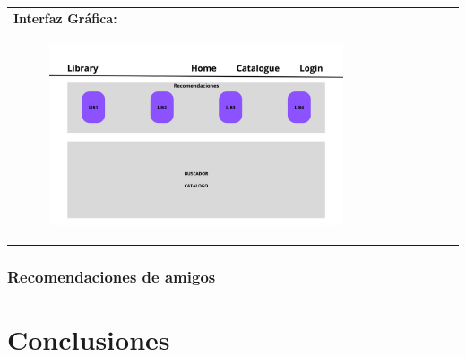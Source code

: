 \documentclass{report}
\begin{document}
\begin{center}
\begin{longtable}{|p{\linewidth}|}
                    \textbf{Interfaz Gráfica:}\\
                    \begin{figure}[H]
                        \centering
                        \includegraphics[width=0.8\textwidth]{./img/grafico/recom_lib.png}
                    \end{figure}\\
                    \hline
                \end{longtable}
            \end{center}
        \clearpage
        \subsection{Recomendaciones de amigos}
    \chapter{Conclusiones} 
\end{document}
